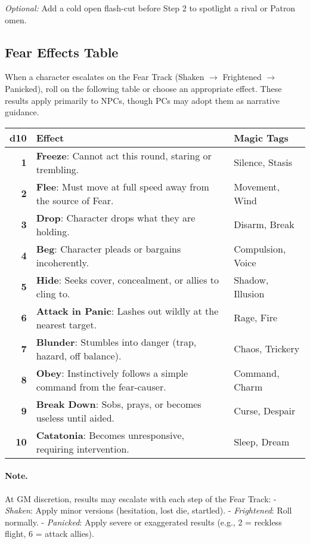 \emph{Optional:} Add a cold open flash-cut before Step 2 to spotlight a rival or Patron omen.

\subsection{Fear Effects Table}
\label{subsec:fear-table}

When a character escalates on the Fear Track (Shaken $\rightarrow$ Frightened $\rightarrow$ Panicked), roll on the following table or choose an appropriate effect. These results apply primarily to NPCs, though PCs may adopt them as narrative guidance.

\begin{center}
\begin{tabular}{>{\bfseries}r l l}
\toprule
d10 & Effect & Magic Tags \\
\midrule
1 & \textbf{Freeze}: Cannot act this round, staring or trembling. & Silence, Stasis \\
2 & \textbf{Flee}: Must move at full speed away from the source of Fear. & Movement, Wind \\
3 & \textbf{Drop}: Character drops what they are holding. & Disarm, Break \\
4 & \textbf{Beg}: Character pleads or bargains incoherently. & Compulsion, Voice \\
5 & \textbf{Hide}: Seeks cover, concealment, or allies to cling to. & Shadow, Illusion \\
6 & \textbf{Attack in Panic}: Lashes out wildly at the nearest target. & Rage, Fire \\
7 & \textbf{Blunder}: Stumbles into danger (trap, hazard, off balance). & Chaos, Trickery \\
8 & \textbf{Obey}: Instinctively follows a simple command from the fear-causer. & Command, Charm \\
9 & \textbf{Break Down}: Sobs, prays, or becomes useless until aided. & Curse, Despair \\
10 & \textbf{Catatonia}: Becomes unresponsive, requiring intervention. & Sleep, Dream \\
\bottomrule
\end{tabular}
\end{center}

\paragraph{Note.}  
At GM discretion, results may escalate with each step of the Fear Track:  
- \emph{Shaken}: Apply minor versions (hesitation, lost die, startled).  
- \emph{Frightened}: Roll normally.  
- \emph{Panicked}: Apply severe or exaggerated results (e.g., 2 = reckless flight, 6 = attack allies).  